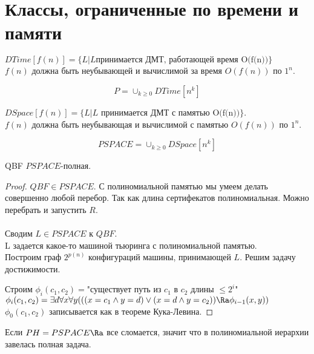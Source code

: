 \section{Классы, ограниченные по времени и памяти}
\begin{Def}
$DTime[f(n)] = \{L| L\text{принимается ДМТ, работающей время O(f(n))}\}$\\
$f(n)$ должна быть неубывающей и вычислимой за время $O(f(n))$ по $1^n$.\\
\end{Def}
\begin{Rem}
$$P = \cup_{k \ge 0}DTime[n^k]$$
\end{Rem}
\begin{Def}
$DSpace[f(n)] = \{L|L\text{ принимается ДМТ с памятью O(f(n))}\}$.\\
$f(n)$ должна быть неубывающая и вычислимой с памятью $O(f(n))$ по $1^n$.
\end{Def}
\begin{Def}
$$PSPACE = \cup_{k \ge 0}DSpace[n^k]$$
\end{Def}
\begin{theorem}
QBF $PSPACE$-полная. 
\end{theorem}
\begin{proof}
$QBF \in  PSPACE$. 
С полиномиальной памятью мы умеем делать совершенно любой перебор. 
Так как длина сертифекатов полиномиальная. Можно перебрать и 
запустить $R$.\\                                
\\
Сводим $L \in PSPACE$ к $QBF$.\\
L задается какое-то машиной тьюринга с полиномиальной памятью.\\ 
Построим граф $2^{p(n)}$ конфигураций машины,
принимающей $L$. Решим задачу достижимости.

Строим $\phi_i(c_1, c_2) = $"существует путь из $c_1$ в $c_2$ длины $\le 2^i$"\\
$\phi_i(c_1, c_2) = \exists d \forall x \forall y(((x = c_1 \wedge y = d) \vee (x = d \wedge y = c_2)) \Ra \phi_{i - 1}(x, y))$\\
$\phi_0(c_1, c_2)$ записывается как в теореме Кука-Левина.  
\end{proof}
\begin{conseq}
Если $PH = PSPACE \Ra$ все сломается, значит
что в полиномиальной иерархии завелась полная задача. 
\end{conseq}

